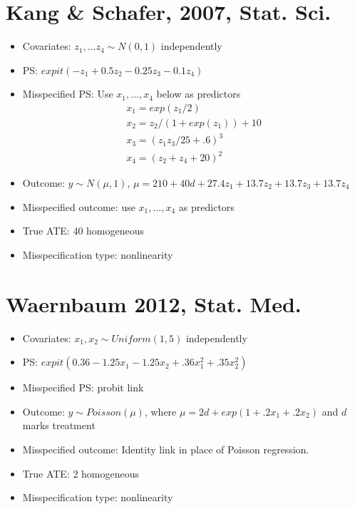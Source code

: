 \documentclass{article}
\begin{document}
\section{Kang \& Schafer, 2007, Stat. Sci. \cite{Kang2007}}
\begin{itemize}
\item Covariates:  $z_1, \ldots z_4 \sim N(0,1)$ independently
\item PS: $expit(-z_1 + 0.5z_2 -0.25z_3 - 0.1z_4)$
\item 
Misspecified PS: Use $x_1, \ldots, x_4$ below as predictors 
\begin{displaymath} \begin{split} x_1 = exp(z_1/2)  \\
x_2 = z_2 /(1+exp(z_1)) + 10\\
x_3 = (z_1z_3/25 + .6)^3 \\
x_4 = (z_2 +z_4 +20)^2 
\end{split}\end{displaymath}
\item Outcome:  $y \sim N(\mu, 1)$, $\mu = 210 + 40d  + 27.4 z_1 + 13.7z_2 + 13.7z_3+ 13.7z_4$\\
\item Misspecified outcome: use $x_1, \ldots, x_4$ as predictors
\item True ATE:  40 homogeneous 
\item Misspecification type: nonlinearity
\end{itemize}


\section{Waernbaum 2012, Stat. Med. \cite{Waernbaum2012}}
\begin{itemize}
\item Covariates: $x_1, x_2 \sim Uniform(1, 5)$ independently
\item PS: $expit(0.36-1.25x_1-1.25x_2 + .36 x_1^2 + .35x_2^2)$
\item Misspecified PS: probit link 
\item Outcome: $y \sim Poisson(\mu)$, where $\mu = 2d + exp(1+.2x_1 + .2x_2)$ and $d$ marks treatment
\item Misspecified outcome: Identity link in place of Poisson regression.
\item True ATE: 2 homogeneous 
\item Misspecification type: nonlinearity
\end{itemize}
\end{document}
